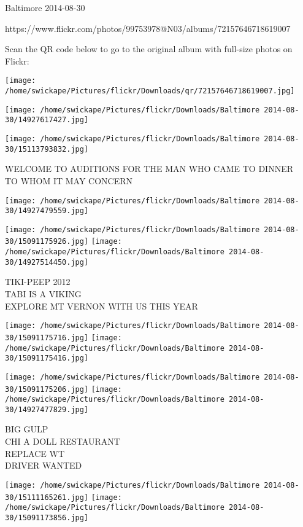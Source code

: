 \documentclass[10pt,letterpaper]{article}
\begin{document}
Baltimore 2014-08-30

https://www.flickr.com/photos/99753978@N03/albums/72157646718619007

Scan the QR code below to go to the original album with full-size photos on Flickr:

\texttt{[image: /home/swickape/Pictures/flickr/Downloads/qr/72157646718619007.jpg]}
\pagebreak

\texttt{[image: /home/swickape/Pictures/flickr/Downloads/Baltimore 2014-08-30/14927617427.jpg]}

\vspace{0.25in}
\texttt{[image: /home/swickape/Pictures/flickr/Downloads/Baltimore 2014-08-30/15113793832.jpg]}

WELCOME TO AUDITIONS FOR THE MAN WHO CAME TO DINNER\\
TO WHOM IT MAY CONCERN\\
\pagebreak

\texttt{[image: /home/swickape/Pictures/flickr/Downloads/Baltimore 2014-08-30/14927479559.jpg]}

\vspace{0.25in}
\texttt{[image: /home/swickape/Pictures/flickr/Downloads/Baltimore 2014-08-30/15091175926.jpg]}
\texttt{[image: /home/swickape/Pictures/flickr/Downloads/Baltimore 2014-08-30/14927514450.jpg]}

TIKI{-}PEEP 2012\\
TABI IS A VIKING\\
EXPLORE MT VERNON WITH US THIS YEAR\\
\pagebreak

\texttt{[image: /home/swickape/Pictures/flickr/Downloads/Baltimore 2014-08-30/15091175716.jpg]}
\texttt{[image: /home/swickape/Pictures/flickr/Downloads/Baltimore 2014-08-30/15091175416.jpg]}

\texttt{[image: /home/swickape/Pictures/flickr/Downloads/Baltimore 2014-08-30/15091175206.jpg]}
\texttt{[image: /home/swickape/Pictures/flickr/Downloads/Baltimore 2014-08-30/14927477829.jpg]}

BIG GULP\\
CHI A DOLL RESTAURANT\\
REPLACE WT\\
DRIVER WANTED\\
\pagebreak

\texttt{[image: /home/swickape/Pictures/flickr/Downloads/Baltimore 2014-08-30/15111165261.jpg]}
\texttt{[image: /home/swickape/Pictures/flickr/Downloads/Baltimore 2014-08-30/15091173856.jpg]}
\end{document}
